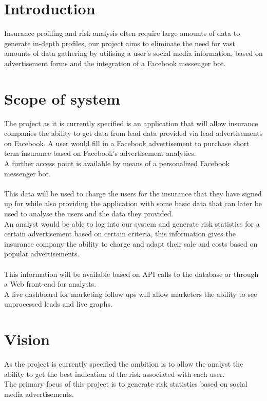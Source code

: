 \documentclass{article}
\begin{document}
\pagebreak

\section{Introduction}
 Insurance profiling and risk analysis often require large amounts of data to generate in-depth profiles, our project aims to eliminate the need for vast amounts of data gathering by utilising a user's social media information, based on advertisement forms and the integration of a Facebook messenger bot.

\section{Scope of system}
The project as it is currently specified is an application that will allow insurance companies the ability to get data from lead data provided via lead advertisements on Facebook.
A user would fill in a Facebook advertisement to purchase short term insurance based on Facebook's advertisement analytics. \\
A further access point is available by means of a personalized Facebook messenger bot.\\ \\ This data will be used to charge the users for the insurance that they have signed up for while also providing the application with some basic data that can later be used to analyse the users and the data they provided. \\
An analyst would be able to log into our system and generate risk statistics for a certain advertisement based on certain criteria, this information gives the insurance company the ability to charge and adapt their sale and costs based on popular advertisements.\\ \\
This information will be available based on API calls to the database or through a Web front-end for analysts.\\
A live dashboard for marketing follow ups will allow marketers the ability to see unprocessed leads and live graphs.


\section{Vision}
As the project is currently specified the ambition is to allow the analyst the ability to get the best indication of the risk associated with each user.\\
The primary focus of this project is to generate risk statistics based on social media advertisements.
\pagebreak
\end{document}
